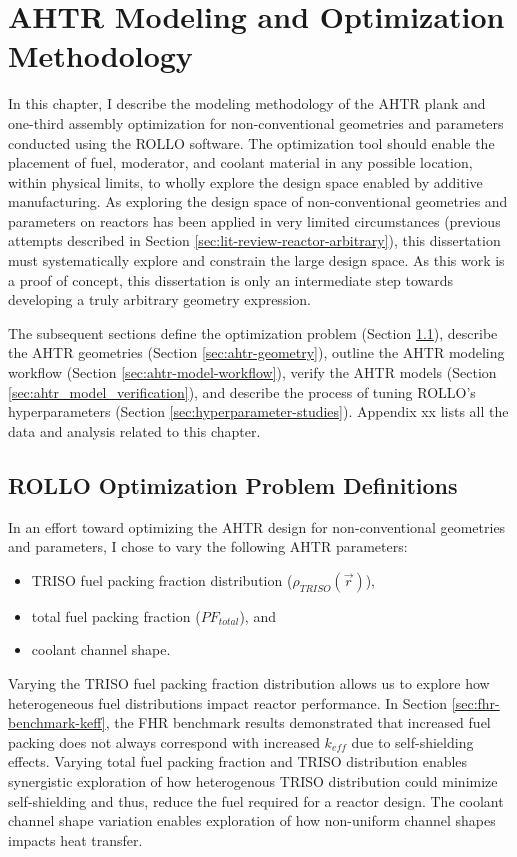 \chapter{AHTR Modeling and Optimization Methodology}
\glsresetall
\label{chap:method}
In this chapter, I describe the modeling methodology of the 
\gls{AHTR} plank and one-third assembly optimization for non-conventional 
geometries and parameters conducted using the \gls{ROLLO} software.
The optimization tool should enable the placement of fuel, moderator, and coolant 
material in any possible location, within physical limits, to wholly explore the 
design space enabled by additive manufacturing. 
As exploring the design space of non-conventional geometries and parameters on 
reactors has been applied in very limited circumstances (previous attempts described 
in Section \ref{sec:lit-review-reactor-arbitrary}), this dissertation must 
systematically explore and constrain the large design space. 
As this work is a proof of concept, this dissertation is only an intermediate step 
towards developing a truly arbitrary geometry expression. 

The subsequent sections define the optimization problem (Section \ref{sec:opt-problem}), 
describe the \gls{AHTR} geometries (Section \ref{sec:ahtr-geometry}), 
outline the \gls{AHTR} modeling workflow (Section \ref{sec:ahtr-model-workflow}), 
verify the \gls{AHTR} models (Section \ref{sec:ahtr_model_verification}), 
and describe the process of tuning \gls{ROLLO}'s hyperparameters (Section 
\ref{sec:hyperparameter-studies}). 
Appendix xx lists all the data and analysis related to this chapter.

\section{ROLLO Optimization Problem Definitions}
\label{sec:opt-problem}
In an effort toward optimizing the \gls{AHTR} design for non-conventional geometries 
and parameters, 
I chose to vary the following \gls{AHTR} parameters: 
\begin{itemize}
    \item \gls{TRISO} fuel packing fraction distribution ($\rho_{TRISO}(\vec{r})$),
    \item total fuel packing fraction ($PF_{total}$), and 
    \item coolant channel shape.
\end{itemize} 
Varying the \gls{TRISO} fuel packing fraction distribution allows us to explore how 
heterogeneous fuel distributions impact reactor performance.
In Section \ref{sec:fhr-benchmark-keff}, the \gls{FHR} benchmark results demonstrated 
that increased fuel packing does not always correspond with increased $k_{eff}$ due to 
self-shielding effects. 
Varying total fuel packing fraction and TRISO distribution enables synergistic
exploration of how heterogenous TRISO distribution could minimize self-shielding and 
thus, reduce the fuel required for a reactor design. 
The coolant channel shape variation enables exploration of how non-uniform 
channel shapes impacts heat transfer. 

